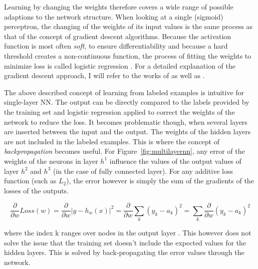 Learning by changing the weights therefore covers a wide range of possible adaptions to the network structure. When
looking at a single (sigmoid) perceptron, the changing of the weights of its input values is the same process as that of the
concept of gradient descent algorithms. Because the activation function is most often \emph{soft}, to ensure
differentiability and because a hard threshold creates a non-continuous function, the process of fitting the weights to
minimize loss is called logistic regression \cite[p.729f.]{russell2016artificial}. For a detailed explanation of the gradient
descent approach, I will refer to the works of \citet{russell2016artificial} as well as
\citet{Goodfellow-et-al-2016}. 

 


The above described concept of learning from labeled examples is intuitive for single-layer \ac {NN}. The output can be
directly compared to the labels provided by the training set and logistic regression applied to correct the weights of
the network to reduce the loss. It becomes problematic though, when several layers are inserted between the input and
the output. The weights of the hidden layers are not included in the labeled examples. This is where the concept of
\emph{backpropagation} becomes useful. For Figure~\ref{fig:multilayernn}, any error of the weights of the neurons in
layer $h^1$ influence the values of the output values of layer $h^2$ and $h^3$ (in the case of fully connected layer).
For any additive loss function (such as $L_2$), the error however is simply the sum of the gradients of the losses of
the outputs\cite[p.733f.]{russell2016artificial}. 

\begin{equation}
\frac{\partial}{\partial w} Loss(w) =  \frac{\partial}{\partial w} \vert y-h_w(x) \vert ^2 = \frac{\partial}{\partial w} \sum_k{(y_k - a_k)^2} =  \sum_k{\frac{\partial}{\partial w}(y_k - a_k)^2} 
    \label{equ:errorssum}
\end{equation}

where the index k ranges over nodes in the output layer \cite[p.733f.]{russell2016artificial}. This however does not
solve the issue that the training set doesn't include the expected values for the hidden layers. This is solved by
back-propagating the error values through the network. %


